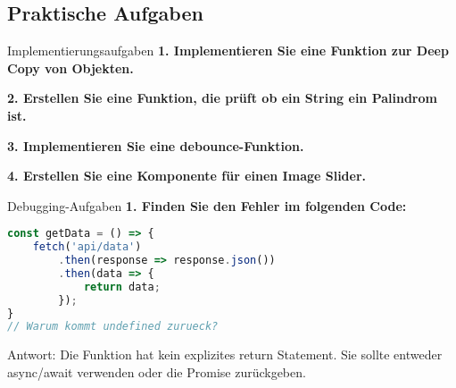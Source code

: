\subsection{Praktische Aufgaben}

\begin{example2}{Implementierungsaufgaben}
    \textbf{1. Implementieren Sie eine Funktion zur Deep Copy von Objekten.}
    
    \textbf{2. Erstellen Sie eine Funktion, die prüft ob ein String ein Palindrom ist.}
    
    \textbf{3. Implementieren Sie eine debounce-Funktion.}
    
    \textbf{4. Erstellen Sie eine Komponente für einen Image Slider.}
\end{example2}

\begin{example2}{Debugging-Aufgaben}
    \textbf{1. Finden Sie den Fehler im folgenden Code:}
    \begin{lstlisting}[language=JavaScript, style=basesmol]
const getData = () => {
    fetch('api/data')
        .then(response => response.json())
        .then(data => {
            return data;
        });
}
// Warum kommt undefined zurueck?
    \end{lstlisting}
    
    Antwort: Die Funktion hat kein explizites return Statement. Sie sollte entweder async/await verwenden oder die Promise zurückgeben.
\end{example2}
